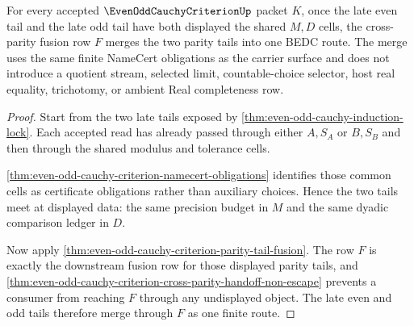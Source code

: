 \begin{theorem}
\label{thm:even-odd-cauchy-tail-merge}
For every accepted $\EvenOddCauchyCriterionUp$ packet $K$, once the late even tail and the late odd tail have both displayed the shared $M,D$ cells, the cross-parity fusion row $F$ merges the two parity tails into one BEDC route. The merge uses the same finite NameCert obligations as the carrier surface and does not introduce a quotient stream, selected limit, countable-choice selector, host real equality, trichotomy, or ambient Real completeness row.
\end{theorem}
\begin{proof}
Start from the two late tails exposed by \autoref{thm:even-odd-cauchy-induction-lock}. Each accepted read has already passed through either $A,S_A$ or $B,S_B$ and then through the shared modulus and tolerance cells.

\autoref{thm:even-odd-cauchy-criterion-namecert-obligations} identifies those common cells as certificate obligations rather than auxiliary choices. Hence the two tails meet at displayed data: the same precision budget in $M$ and the same dyadic comparison ledger in $D$.

Now apply \autoref{thm:even-odd-cauchy-criterion-parity-tail-fusion}. The row $F$ is exactly the downstream fusion row for those displayed parity tails, and \autoref{thm:even-odd-cauchy-criterion-cross-parity-handoff-non-escape} prevents a consumer from reaching $F$ through any undisplayed object. The late even and odd tails therefore merge through $F$ as one finite route.
\end{proof}

